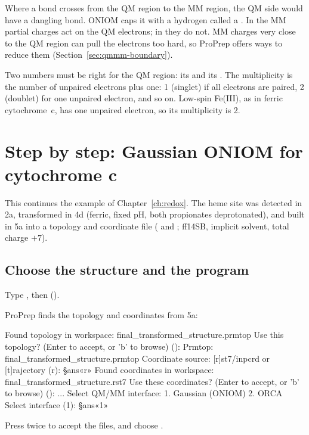 Where a bond crosses from the QM region to the MM region, the QM side would
have a dangling bond. ONIOM caps it with a hydrogen called a
. In  the MM partial charges act on
the QM electrons; in  they do not. MM charges very
close to the QM region can pull the electrons too hard, so ProPrep offers ways
to reduce them (Section~\ref{sec:qmmm-boundary}).

Two numbers must be right for the QM region: its  and its
. The multiplicity is the number of unpaired electrons plus
one: 1 (singlet) if all electrons are paired, 2 (doublet) for one unpaired
electron, and so on. Low-spin Fe(III), as in ferric cytochrome~c, has one
unpaired electron, so its multiplicity is 2.

\section{Step by step: Gaussian ONIOM for cytochrome c}
\label{sec:qmmm-oniom}

This continues the  example of Chapter~\ref{ch:redox}. The heme site
was detected in 2a, transformed in 4d (ferric, fixed pH, both propionates
deprotonated), and built in 5a into a topology and coordinate file
( and ; ff14SB, implicit solvent, total charge
$+7$).

\subsection*{Choose the structure and the program}

\begin{steps}
  \item Type , then  ().
  \item ProPrep finds the topology and coordinates from 5a:
\begin{screen}
  Found topology in workspace: final_transformed_structure.prmtop
Use this topology? (Enter to accept, or 'b' to browse) ():
  Prmtop: final_transformed_structure.prmtop
Coordinate source: [r]st7/inpcrd or [t]rajectory (r): §ans«r»
  Found coordinates in workspace: final_transformed_structure.rst7
Use these coordinates? (Enter to accept, or 'b' to browse) ():
...
Select QM/MM interface:
  1. Gaussian (ONIOM)
  2. ORCA
Select interface (1): §ans«1»
\end{screen}
        Press  twice to accept the files, and choose .
\end{steps}

